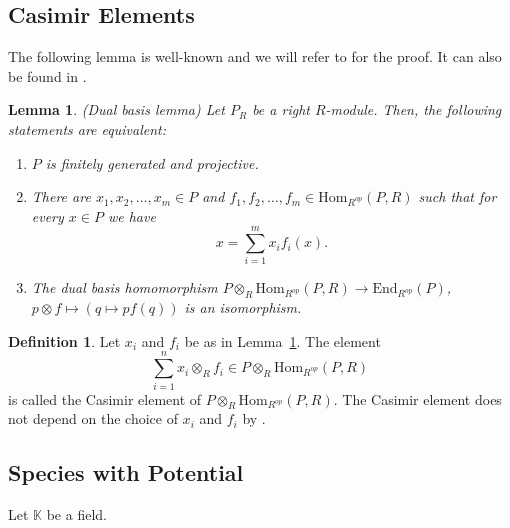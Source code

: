 \documentclass[a4paper, reqno]{amsart}
\newtheorem{mylemma}[mythm]{Lemma}
\theoremstyle{definition}
\newtheorem{mydef}[mythm]{Definition}
\newcommand{\K}{\mathbb{K}}
\begin{document}
\subsection{Casimir Elements}
The following lemma is well-known and we will refer to \cite[Lemma 4.1]{kulshammer2017pro} for the proof. It can also be found in \cite{PareigisLnotes}.

\begin{mylemma}\label{lemma - dual basis}(Dual basis lemma)
	Let $P_R$ be a right $R$-module. Then, the following statements are equivalent:
	\begin{enumerate}
		\item $P$ is finitely generated and projective.
		\item There are $x_1, x_2, \dots, x_m\in P$ and $f_1, f_2, \dots, f_m\in \mathrm{Hom}_{R^{op}}(P, R)$ such that for every $x\in P$ we have
		\begin{equation*}
			x = \sum_{i=1}^m x_if_i(x).
		\end{equation*}
		\item The dual basis homomorphism $P\otimes_R \mathrm{Hom}_{R^{op}}(P, R) \to \mathrm{End}_{R^{op}}(P)$, $p\otimes f\mapsto (q\mapsto pf(q))$ is an isomorphism.
	\end{enumerate}
\end{mylemma}

\begin{mydef}
	Let $x_i$ and $f_i$ be as in Lemma~\ref{lemma - dual basis}. The element
	\begin{equation*}
		\sum_{i=1}^n x_i\otimes_R f_i\in P\otimes_R \mathrm{Hom}_{R^{op}}(P, R)
	\end{equation*}
	is called the Casimir element of $P\otimes_R \mathrm{Hom}_{R^{op}}(P, R)$. The Casimir element does not depend on the choice of $x_i$ and $f_i$ by \cite[Lemma 1.1]{Dlab_1980}.
\end{mydef}

\subsection{Species with Potential}
Let $\K$ be a field.
\end{document}

